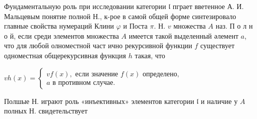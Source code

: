 \documentclass[10pt]{article}
\begin{document}
Фундаментальную роль при исследовании категории $\mathfrak{l}$ пграет вветенное А. И. Мальцевым понятие полной Н., к-рое в самой общей форме синтезировало главные свойства нумераций Клини $\varphi$ и Поста $\pi$. Н. $v$ множества $A$ наз. П о л н о й, если среди элементов множества $A$ имеется такой выделенный әлемент $a$, что для любой олноместной част ично рекурсивной функции $f$ существует одноместная общерекурсивная функция $h$ такая, что



$v h(x)=\left\{\begin{array}{l}v f(x), \text { если значение } f(x) \text { определено, } \\ a \text { в противном случае. }\end{array}\right.$



Полшые Н. играют роль «инъективных» элементов категории $\mathfrak{l}$ и наличие у $A$ полных $Н$. свидетельствует
\end{document}
